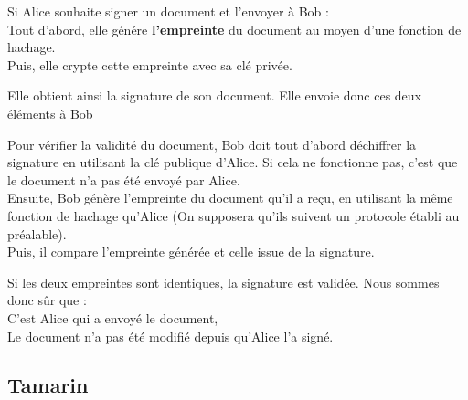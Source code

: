 \documentclass[conference]{IEEEtran}
\begin{document}
Si Alice souhaite signer un document et l'envoyer à Bob : \\
    Tout d'abord, elle génére \textbf{l'empreinte} du document au moyen d'une fonction de hachage.\\
    Puis, elle crypte cette empreinte avec sa clé privée.

    Elle obtient ainsi la signature de son document. Elle envoie donc ces deux éléments à Bob

    Pour vérifier la validité du document, Bob doit tout d'abord déchiffrer la signature en utilisant la clé publique d'Alice. Si cela ne fonctionne pas, c'est que le document n'a pas été envoyé par Alice.\\
    Ensuite, Bob génère l'empreinte du document qu'il a reçu, en utilisant la même fonction de hachage qu'Alice (On supposera qu'ils suivent un protocole établi au préalable).\\
    Puis, il compare l'empreinte générée et celle issue de la signature.

    Si les deux empreintes sont identiques, la signature est validée. Nous sommes donc sûr que : \\
        C'est Alice qui a envoyé le document, \\
        Le document n'a pas été modifié depuis qu'Alice l'a signé.
\cite{igmsign}
\subsection{Tamarin}
\end{document}
